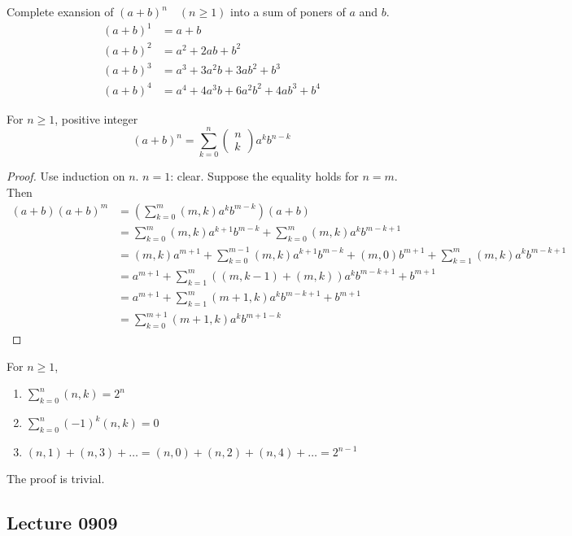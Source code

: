 \documentclass{article}
\begin{document}
\begin{multicols}{2}
\begin{mytheorem}
Complete exansion of $(a+b)^n\quad (n\geq 1)$ into a sum of poners of $a$ and $b$.
\begin{align}
    (a+b)^1 &= a+b\\
    (a+b)^2 &= a^2+2ab+b^2\\
    (a+b)^3 &= a^3+3a^2b+3ab^2+b^3\\
    (a+b)^4 &= a^4+4a^3b+6a^2b^2+4ab^3+b^4
\end{align}
\end{mytheorem}

\begin{mytheorem}
For $n\geq 1$, positive integer
\begingroup
\everymath{\displaystyle}
$$(a+b)^n=\sum_{k=0}^{n}\begin{pmatrix}
n\\
k
\end{pmatrix}
a^kb^{n-k}
$$
\endgroup
\end{mytheorem}
\begin{proof}
Use induction on $n$. $n=1$: clear. Suppose the equality holds for $n=m$. Then
\begin{align}
    (a+b)(a+b)^m&=\left(\sum_{k=0}^{m}(m,k)a^kb^{m-k} \right)(a+b)\\  
    &= \sum_{k=0}^{m}(m,k)a^{k+1}b^{m-k}+\sum_{k=0}^{m}(m,k)a^kb^{m-k+1}\\
    &=(m,k)a^{m+1}+\sum_{k=0}^{m-1}(m,k)a^{k+1}b^{m-k}+(m,0)b^{m+1}+\sum_{k=1}^{m}(m,k)a^kb^{m-k+1}\\
    &=a^{m+1}+\sum_{k=1}^{m}\left((m,k-1)+(m,k)\right)a^kb^{m-k+1}+b^{m+1}\\
    &=a^{m+1}+\sum_{k=1}^{m}(m+1,k)a^kb^{m-k+1}+b^{m+1}\\
    &=\sum_{k=0}^{m+1}(m+1,k)a^kb^{m+1-k}
\end{align}
\end{proof}

\begin{example}
For $n\geq 1$,
\begin{enumerate}[label={(\alph*)}]
\item $\displaystyle \sum_{k=0}^{n}(n,k)=2^n$
\item $\displaystyle \sum_{k=0}^{n}(-1)^k(n,k)=0$
\item $\displaystyle (n,1)+(n,3)+\dots =(n,0)+(n,2)+(n,4)+\dots = 2^{n-1}$
\end{enumerate}
\end{example}
The proof is trivial.

\subsection{Lecture 0909}

\end{multicols}
\end{document}
